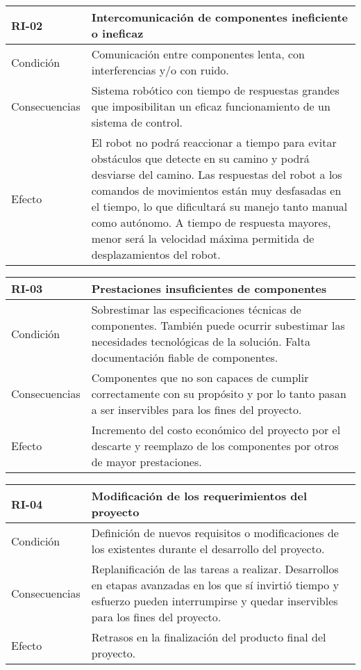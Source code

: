 \begin{center}
\begin{tabular} {|m{2.5cm}|m{11.5cm}|}
	\hline
	RI-02 & Intercomunicación de componentes ineficiente o ineficaz \\
	\hline
    	Condición & Comunicación entre componentes lenta, con interferencias y/o con ruido. \\
	\hline
    	Consecuencias & Sistema robótico con tiempo de respuestas grandes que imposibilitan un eficaz funcionamiento de un sistema de control. \\
	\hline
    	Efecto & El robot no podrá reaccionar a tiempo para evitar obstáculos que detecte en su camino y podrá desviarse del camino. Las respuestas del robot a los comandos de movimientos están muy desfasadas en el tiempo, lo que dificultará su manejo tanto manual como autónomo. A tiempo de respuesta mayores, menor será la velocidad máxima permitida de desplazamientos del robot. \\
	\hline
	\end{tabular} \end{center}

\begin{center}
\begin{tabular} {|m{2.5cm}|m{11.5cm}|}
	\hline
	RI-03 & Prestaciones insuficientes de componentes \\
	\hline
    	Condición & Sobrestimar las especificaciones técnicas de componentes. También puede ocurrir subestimar las necesidades tecnológicas de la solución. Falta documentación fiable de componentes. \\
	\hline
    	Consecuencias & Componentes que no son capaces de cumplir correctamente con su propósito y por lo tanto pasan a ser inservibles para los fines del proyecto. \\
	\hline
    	Efecto & Incremento del costo económico del proyecto por el descarte y reemplazo de los componentes por otros de mayor prestaciones. \\
	\hline
\end{tabular}
\end{center}

\begin{center}
\begin{tabular} {|m{2.5cm}|m{11.5cm}|}
	\hline
	RI-04 & Modificación de los requerimientos del proyecto \\
	\hline
    	Condición & Definición de nuevos requisitos o modificaciones de los existentes durante el desarrollo del proyecto. \\
	\hline
    	Consecuencias & Replanificación de las tareas a realizar. Desarrollos en etapas avanzadas en los que sí invirtió tiempo y esfuerzo pueden interrumpirse y quedar inservibles para los fines del proyecto. \\
	\hline
    	Efecto & Retrasos en la finalización del producto final del proyecto. \\
	\hline
\end{tabular}
\end{center}

